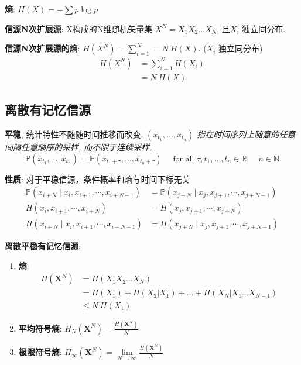 \documentclass{article}
\newcommand{\env}[2]{\begin{#1}#2\end{#1}}
\newcommand{\defi}[2]{\textbf{#1}, #2}
\begin{document}
            
        \textbf{熵}: $H(X) = -\sum p \log p$
        
        \textbf{信源N次扩展源}: X构成的N维随机矢量集 $X^N = X_1 X_2...X_N$, 且$X_i$ 独立同分布.

        \textbf{信源N次扩展源的熵}: $H(X^N) = \sum_{i=1}^N = N\ H(X)$. ($X_i$ 独立同分布)
            \env{align*}{
                H(X^N) 
                &= \sum_{i=1}^N H(X_i)  \tag{$X_i$ 独立}\\
                &= N\ H(X)  \tag{$X_i$ 同分布}
            }
        
    \subsection{离散有记忆信源}
            
            \defi{平稳}{统计特性不随随时间推移而改变. \textit{$\left(x_{t_{1}}, \ldots, x_{t_{n}}\right)$ 指在时间序列上随意的任意间隔任意顺序的采样, 而不限于连续采样.}
                $$ \mathbb P\left(x_{t_{1}}, \ldots, x_{t_{n}}\right) = \mathbb P\left(x_{t_{1}+\tau}, \ldots, x_{t_{n}+\tau}\right) \quad \text { for all } \tau, t_{1}, \ldots, t_{n} \in \mathbb{R}, \quad n \in \mathbb{N}$$
            }
                
                \textbf{性质}: 
                    对于平稳信源，条件概率和熵与时间下标无关.
                        \env{align*}{
                            \mathbb P\left(x_{i+N} \mid x_{i}, x_{i+1}, \cdots, x_{i+N-1}\right) &= \mathbb P\left(x_{j+N} \mid x_{j}, x_{j+1}, \cdots, x_{j+N-1}\right) \tag{条件概率}\\
                            H\left(x_{i}, x_{i+1}, \cdots, x_{i+N}\right) &= H\left(x_{j}, x_{j+1}, \cdots, x_{j+N}\right) \tag{熵}\\
                            H\left(x_{i+N} \mid x_{i}, x_{i+1}, \cdots, x_{i+N-1}\right) &= H\left(x_{j+N} \mid x_{j}, x_{j+1}, \cdots, x_{j+N-1}\right) \tag{条件熵}
                        }
                        
            \textbf{离散平稳有记忆信源}:
                \env{enumerate}{
                \item \textbf{熵}:
                    \env{align*}{
                        H(\boldsymbol X^N) 
                        &= H(X_1 X_2 ... X_N) \tag{定义}\\
                        &= H(X_1) + H(X_2|X_1) + ... + H(X_N | X_1 ... X_{N-1}) \tag{条件熵展开}\\
                        &\le N\ H(X_1) \tag{熵的不增原理}
                    }
                \item \textbf{平均符号熵}: $H_N(\boldsymbol X^N) = \frac{H(\boldsymbol X^N)}{N}$
                \item \textbf{极限符号熵}: $H_\infty(\boldsymbol X^N) = \lim\limits_{N \to \infty} \frac{H(\boldsymbol X^N)}{N}$
                }
                
\end{document}

